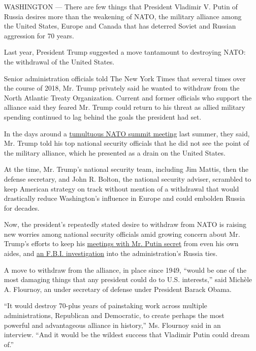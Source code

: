 WASHINGTON --- There are few things that President Vladimir V. Putin of
Russia desires more than the weakening of NATO, the military alliance
among the United States, Europe and Canada that has deterred Soviet and
Russian aggression for 70 years.

Last year, President Trump suggested a move tantamount to destroying
NATO: the withdrawal of the United States.

Senior administration officials told The New York Times that several
times over the course of 2018, Mr. Trump privately said he wanted to
withdraw from the North Atlantic Treaty Organization. Current and former
officials who support the alliance said they feared Mr. Trump could
return to his threat as allied military spending continued to lag behind
the goals the president had set.

In the days around a
\href{https://www.nytimes.com/2018/07/12/world/europe/trump-nato-russia.html}{tumultuous
NATO summit meeting} last summer, they said, Mr. Trump told his top
national security officials that he did not see the point of the
military alliance, which he presented as a drain on the United States.

At the time, Mr. Trump's national security team, including Jim Mattis,
then the defense secretary, and John R. Bolton, the national security
adviser, scrambled to keep American strategy on track without mention of
a withdrawal that would drastically reduce Washington's influence in
Europe and could embolden Russia for decades.

Now, the president's repeatedly stated desire to withdraw from NATO is
raising new worries among national security officials amid growing
concern about Mr. Trump's efforts to keep his
\href{https://www.nytimes.com/2019/01/13/us/politics/trump-putin-russia-meetings.html}{meetings
with Mr. Putin secret} from even his own aides, and
\href{https://www.nytimes.com/2019/01/11/us/politics/fbi-trump-russia-inquiry.html}{an
F.B.I. investigation} into the administration's Russia ties.

A move to withdraw from the alliance, in place since 1949, ``would be
one of the most damaging things that any president could do to U.S.
interests,'' said Michèle A. Flournoy, an under secretary of defense
under President Barack Obama.

``It would destroy 70-plus years of painstaking work across multiple
administrations, Republican and Democratic, to create perhaps the most
powerful and advantageous alliance in history,'' Ms. Flournoy said in an
interview. ``And it would be the wildest success that Vladimir Putin
could dream of.''


